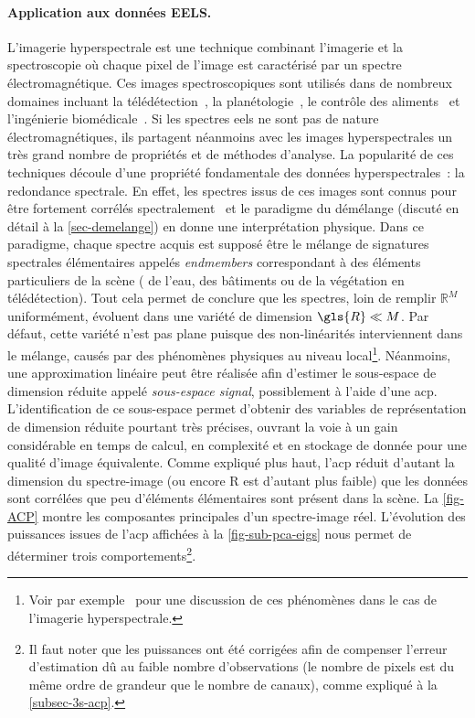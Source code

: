     \paragraph{Application aux données EELS.} L’imagerie hyperspectrale est une technique combinant l’imagerie et la spectroscopie où chaque pixel de l'image est caractérisé par un spectre électromagnétique. Ces images spectroscopiques sont utilisés dans de nombreux domaines incluant la télédétection~\cite{schaepman2009earth}, la planétologie~\cite{smith1985quantitative}, le contrôle des aliments~\cite{gowen2007hyperspectral} et l'ingénierie biomédicale~\cite{akbari2010detection}. Si les spectres \gls{eels} ne sont pas de nature électromagnétiques, ils partagent néanmoins avec les images hyperspectrales un très grand nombre de propriétés et de méthodes d'analyse.
    La popularité de ces techniques découle d'une propriété fondamentale des données hyperspectrales~: la redondance spectrale. En effet, les spectres issus de ces images sont connus pour être fortement corrélés spectralement~\cite{dobigeon2016linear, bioucas2012hyperspectral, dobigeon2012spectral} et le paradigme du démélange (discuté en détail à la \cref{sec-demelange}) en donne une interprétation physique. Dans ce paradigme, chaque spectre acquis est supposé être le mélange de signatures spectrales élémentaires appelés \emph{endmembers} correspondant à des éléments particuliers de la scène (\eg{} de l'eau, des bâtiments ou de la végétation en télédétection).
    Tout cela permet de conclure que les spectres, loin de remplir $\mathbb{R}^M$ uniformément, évoluent dans une variété de dimension $\gls{R}\ll M$. Par défaut, cette variété n'est pas plane puisque des non-linéarités interviennent dans le mélange, causés par des phénomènes physiques au niveau local\footnote{Voir par exemple~\cite{dobigeon2014nonlinear} pour une discussion de ces phénomènes dans le cas de l'imagerie hyperspectrale.}. Néanmoins, une approximation linéaire peut être réalisée afin d'estimer le sous-espace de dimension réduite appelé \emph{sous-espace signal}, possiblement à l'aide d'une \gls{acp}. L'identification de ce sous-espace permet d'obtenir des variables de représentation de dimension réduite pourtant très précises, ouvrant la voie à un gain considérable en temps de calcul, en complexité et en stockage de donnée pour une qualité d'image équivalente. Comme expliqué plus haut, l'\gls{acp} réduit d'autant la dimension du spectre-image (ou encore \gls{R} est d'autant plus faible) que les données sont corrélées \ie{} que peu d'éléments élémentaires sont présent dans la scène. La \cref{fig-ACP} montre les composantes principales d'un spectre-image réel. L'évolution des puissances issues de l'\gls{acp} affichées à la \cref{fig-sub-pca-eigs} nous permet de déterminer trois comportements\footnote{Il faut noter que les puissances ont été corrigées afin de compenser l'erreur d'estimation dû au faible nombre d'observations (le nombre de pixels est du même ordre de grandeur que le nombre de canaux), comme expliqué à la \cref{subsec-3s-acp}.}.
